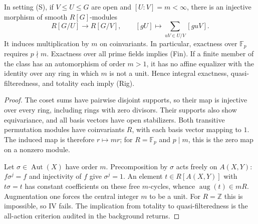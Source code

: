 \begin{proposition}
\label{A:finite-index}
In setting (S), if $V\leq U\leq G$ are open and $[U:V]=m<\infty$,
there is an injective morphism of smooth $R[G]$-modules
\[
 R[G/U]\longrightarrow R[G/V],\qquad
 [gU]\longmapsto\sum_{uV\in U/V}[guV].
\]
It induces multiplication by $m$ on coinvariants. In particular,
exactness over $\mathbb F_p$ requires $p\nmid m$. Exactness over all
prime fields implies (Fin). If a finite member of the class has an
automorphism of order $m>1$, it has no affine equalizer with the identity
over any ring in which $m$ is not a unit. Hence integral exactness,
quasi-filteredness, and totality each imply (Rig).
\end{proposition}
\begin{proof}
The coset sums have pairwise disjoint supports, so their map is
injective over every ring, including rings with zero divisors. Their
supports also show equivariance, and all basis vectors have open
stabilizers. Both transitive permutation modules have coinvariants
$R$, with each basis vector mapping to $1$. The induced map is therefore
$r\mapsto mr$; for $R=\mathbb F_p$ and $p\mid m$, this is the zero map
on a nonzero module.

Let $\sigma\in\operatorname{Aut}(X)$ have order $m$. Precomposition by
$\sigma$ acts freely on $A(X,Y)$: $f\sigma^j=f$ and injectivity of $f$
give $\sigma^j=1$. An element $t\in R[A(X,Y)]$ with $t\sigma=t$ has
constant coefficients on these free $m$-cycles, whence
$\operatorname{aug}(t)\in mR$. Augmentation one forces the central
integer $m$ to be a unit. For $R=\mathbb Z$ this is impossible, so IV
fails. The implication from totality to quasi-filteredness is the
all-action criterion audited in the background returns.
\end{proof}

